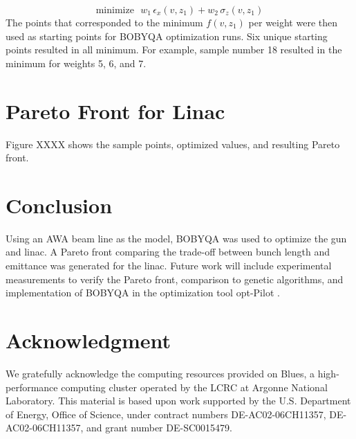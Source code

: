\documentclass[letterpaper,  %
              ]{jacow}
\begin{document}
\begin{equation}
\text{minimize } \, \, w_1 \,\epsilon_x(v,z_1) + w_2 \,\sigma_z(v,z_1)
\label{eq:newobj}
\end{equation}
The points that corresponded to the minimum $f(v,z_1)$ per weight
were then used as starting points for BOBYQA optimization
runs. Six unique starting points resulted in all minimum. 
For example, sample number 18 resulted
in the minimum for weights 5, 6, and 7.

\section{Pareto Front for Linac} 
Figure XXXX shows the sample points, 
optimized values, and resulting Pareto front.


\section{Conclusion}
Using an AWA beam line as the model, BOBYQA
was used to optimize the gun and linac. A Pareto front 
comparing the trade-off between bunch length and emittance
was generated for the linac. Future work will include
experimental measurements to verify the Pareto front, 
comparison to genetic algorithms, and implementation of BOBYQA 
in the optimization tool opt-Pilot \cite{optpilot}.

\section{Acknowledgment}
We gratefully acknowledge the computing resources
provided on Blues, a high-performance computing cluster
operated by the LCRC at Argonne National Laboratory.
This material is based upon work supported by the 
U.S. Department of Energy, Office of Science, under 
contract numbers DE-AC02-06CH11357, DE-AC02-06CH11357, 
and grant number DE-SC0015479. 



\end{document}
